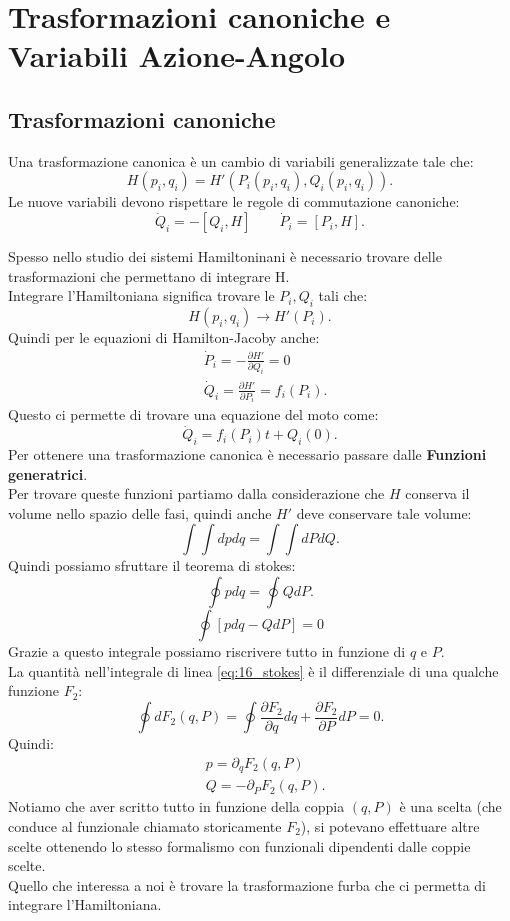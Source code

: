 \section{Trasformazioni canoniche e Variabili Azione-Angolo}%
\label{sub:Lezione 16}
\mylocaltoc
\subsection{Trasformazioni canoniche}%
\label{sub:Trasformazioni canoniche}
\begin{redbox}{}
    Una trasformazione canonica è un cambio di variabili generalizzate tale che:
    \[
        H(p_i, q_i) = H'(P_i(p_i,q_i), Q_i(p_i, q_i) ) 
    .\] 
    Le nuove variabili devono rispettare le regole di commutazione canoniche:
    \[
	\dot{Q}_i = - \left[ Q_i,H\right] \qquad \dot{P}_i = \left[P_i, H\right]
    .\] 
\end{redbox}
\noindent
Spesso nello studio dei sistemi Hamiltoninani è necessario trovare delle trasformazioni che permettano di integrare H. \\
Integrare l'Hamiltoniana significa trovare le $P_i, Q_i$  tali che:
\[
    H(p_i, q_i) \to H'(P_i) 
.\] 
Quindi per le equazioni di Hamilton-Jacoby anche:
\[\begin{aligned}
    & \dot{P}_i = - \frac{\partial H'}{\partial Q_i} =0\\
    & \dot{Q}_i = \frac{\partial H'}{\partial P_i} = f_i(P_i) 
.\end{aligned}\]
Questo ci permette di trovare una equazione del moto come:
\[
    \dot{Q}_i = f_i(P_i) t + Q_i(0) 
.\] 
Per ottenere una trasformazione canonica è necessario passare dalle \textbf{Funzioni generatrici}.\\
Per trovare queste funzioni partiamo dalla considerazione che $H$ conserva il volume nello spazio delle fasi, quindi anche $H'$ deve conservare tale volume:
\[
    \int\int dpdq = \int\int dPdQ
.\] 
Quindi possiamo sfruttare il teorema di stokes:
\[
    \oint pdq = \oint  QdP
.\] 
\begin{equation}
    \oint  \left[pdq - QdP\right] = 0 
    \label{eq:16_stokes}
\end{equation}
Grazie a questo integrale possiamo riscrivere tutto in funzione di $q$ e $P$.\\
La quantità nell'integrale di linea \ref{eq:16_stokes} è il differenziale di una qualche funzione $F_2$:
\[
    \oint dF_2(q,P) = \oint \frac{\partial F_2}{\partial q} dq + \frac{\partial F_2}{\partial P} dP = 0 
.\] 
Quindi:
\[\begin{aligned}
    &p = \partial_{q}F_2(q,P) \\
    &Q = - \partial_{P}F_2(q,P) 
.\end{aligned}\]
Notiamo che aver scritto tutto in funzione della coppia $(q,P)$ è una scelta (che conduce al funzionale chiamato storicamente $F_2$), si potevano effettuare altre scelte ottenendo lo stesso formalismo con funzionali dipendenti dalle coppie scelte.\\
Quello che interessa a noi è trovare la trasformazione furba che ci permetta di integrare l'Hamiltoniana.
